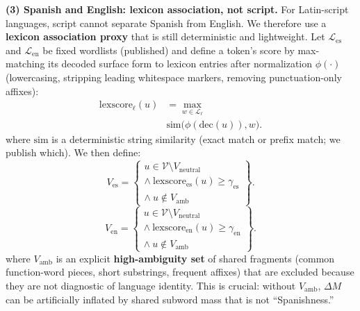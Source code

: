 \begin{itemize}[leftmargin=1.5em]
\begin{description}
\vspace{8pt}
\textbf{(3) Spanish and English: lexicon association, not script.}
For Latin-script languages, script cannot separate Spanish from English. We therefore use a \textbf{lexicon association proxy} that is still deterministic and lightweight. Let $\mathcal{L}_{\mathrm{es}}$ and $\mathcal{L}_{\mathrm{en}}$ be fixed wordlists (published) and define a token’s score by max-matching its decoded surface form to lexicon entries after normalization $\phi(\cdot)$ (lowercasing, stripping leading whitespace markers, removing punctuation-only affixes):
\[
\begin{aligned}
\mathrm{lexscore}_{\ell}(u) &= \max_{w\in \mathcal{L}_{\ell}}\\
&\mathrm{sim}\big(\phi(\mathrm{dec}(u)), w\big).
\end{aligned}
\]
where $\mathrm{sim}$ is a deterministic string similarity (exact match or prefix match; we publish which). We then define:
\[
V_{\mathrm{es}}=
\left\{
\begin{aligned}
u\in \mathcal{V}\setminus V_{\mathrm{neutral}}\\
\land\ \mathrm{lexscore}_{\mathrm{es}}(u)\ge \gamma_{\mathrm{es}}\\
\land\ u\notin V_{\mathrm{amb}}
\end{aligned}
\right\}.
\]
\[
V_{\mathrm{en}}=
\left\{
\begin{aligned}
u\in\mathcal{V}\setminus V_{\mathrm{neutral}}\\
\land\ \mathrm{lexscore}_{\mathrm{en}}(u)\ge \gamma_{\mathrm{en}}\\
\land\ u\notin V_{\mathrm{amb}}
\end{aligned}
\right\}.
\]
where $V_{\mathrm{amb}}$ is an explicit \textbf{high-ambiguity set} of shared fragments (common function-word pieces, short substrings, frequent affixes) that are excluded because they are not diagnostic of language identity. This is crucial: without $V_{\mathrm{amb}}$, $\Delta M$ can be artificially inflated by shared subword mass that is not “Spanishness.”


\end{description}
\end{itemize}
